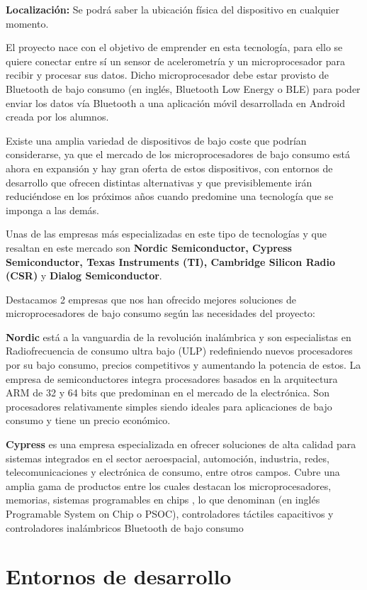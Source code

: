 \textbf{Localización:} Se podrá saber la ubicación física del dispositivo en cualquier momento.

El proyecto nace con el objetivo de emprender en esta tecnología, para ello se quiere conectar entre sí un sensor de acelerometría y un microprocesador para recibir y procesar sus datos. Dicho microprocesador debe estar provisto de Bluetooth de bajo consumo (en inglés, Bluetooth Low Energy o BLE) para poder enviar los datos vía Bluetooth a una aplicación móvil desarrollada en Android creada por los alumnos.

Existe una amplia variedad de dispositivos de bajo coste que podrían considerarse, ya que el mercado de los microprocesadores de bajo consumo está ahora en expansión y hay gran oferta de estos dispositivos, con entornos de desarrollo que ofrecen distintas alternativas y que previsiblemente irán reduciéndose en los próximos años cuando predomine una tecnología que se imponga a las demás.

Unas de las  empresas más especializadas en este tipo de tecnologías y que resaltan en este mercado son \textbf{Nordic Semiconductor, Cypress Semiconductor, Texas Instruments (TI), Cambridge Silicon Radio (CSR)} y \textbf{Dialog Semiconductor}.

Destacamos 2 empresas que nos han ofrecido mejores soluciones de microprocesadores de bajo consumo según las necesidades del proyecto:

\textbf{Nordic} está a la vanguardia de la revolución inalámbrica y son especialistas en Radiofrecuencia de consumo ultra bajo (ULP) redefiniendo nuevos procesadores por su bajo consumo, precios competitivos y aumentando la potencia de estos.
La empresa de semiconductores integra procesadores basados en la arquitectura ARM de 32 y 64 bits que predominan en el mercado de la electrónica. Son procesadores relativamente simples siendo ideales para aplicaciones de bajo consumo y tiene un precio económico. 

\textbf{Cypress} es una empresa especializada en ofrecer soluciones de alta calidad para sistemas integrados en el sector aeroespacial, automoción, industria, redes, telecomunicaciones y electrónica de consumo, entre otros campos. Cubre una amplia gama de productos entre los cuales destacan los microprocesadores, memorias,  sistemas programables en chips , lo que denominan (en inglés Programable System on Chip o PSOC), controladores táctiles capacitivos y controladores inalámbricos Bluetooth de bajo consumo

\section{Entornos de desarrollo}
\label{makereference1.1}

